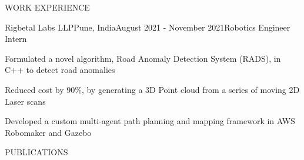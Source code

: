\documentclass{resume} %
\begin{document}
\begin{rSection}{WORK EXPERIENCE}
	\begin{rProjExpDetails}{Rigbetal Labs LLP}{Pune, India}{August 2021 - November 2021}{Robotics Engineer Intern}{}{}
		\item Formulated a novel algorithm, Road Anomaly Detection System (RADS), in C++ to detect road anomalies
		\item Reduced cost by 90\%, by generating a 3D Point cloud from a series of moving 2D Laser scans
		\item Developed a custom multi-agent path planning and mapping framework in AWS Robomaker and Gazebo
	\end{rProjExpDetails}

\end{rSection}
\begin{rSection}{PUBLICATIONS}
	\nocite{*}
	\printbibliography[heading=none]
\end{rSection}
\end{document}
